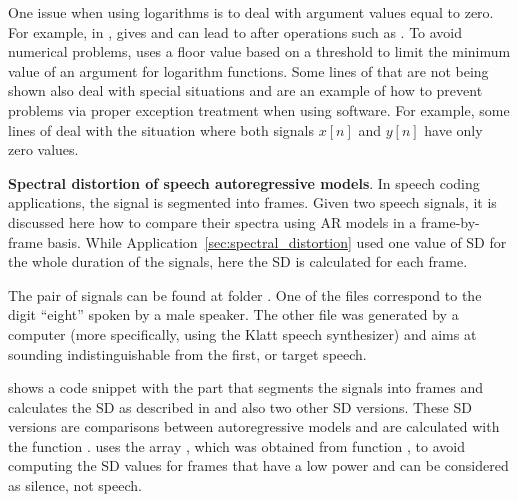 

One issue when using logarithms is to deal with argument values equal to zero. For example, in {\matlab},  gives   and can lead to  after operations such as . To avoid numerical problems,
 uses a floor value based on a threshold to limit the minimum value of an argument for logarithm functions. Some lines of  that are not being shown also deal with special situations and are an example of how to prevent problems via proper exception treatment when using software. For example, some lines 
of  deal with the situation where both signals $x[n]$ and $y[n]$ have only zero values.
\eApplication

\bApplication \textbf{Spectral distortion of speech autoregressive models}.
In speech coding applications, the signal is segmented into frames. Given two speech signals, it is discussed here how to compare their spectra using AR models in a frame-by-frame basis. While Application~\ref{sec:spectral_distortion} used one value of SD for the whole duration of the signals, here the SD is calculated for each frame.

The pair of signals can be found at folder . One of the files correspond to the digit ``eight'' spoken by a male speaker. The other file was generated by a computer (more specifically, using the Klatt speech synthesizer) and aims at sounding  indistinguishable from the first, or target speech.

 shows a code snippet with the part that segments the signals into frames and calculates the SD as described in  and also two other SD versions. These SD versions are comparisons between autoregressive models and are calculated with the function .
 uses the array , which was obtained from function , to avoid computing the SD values for frames that have a low power and can be considered as silence, not speech.



